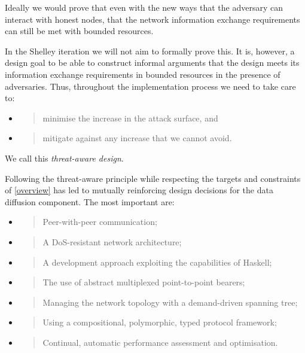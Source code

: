 \documentclass[11pt,a4paper]{article}
\begin{document}
Ideally we would prove that even with the new ways that the adversary
can interact with honest nodes, that the network information exchange
requirements can still be met with bounded resources.

In the Shelley iteration we will not aim to formally prove this. It is,
however, a design goal to be able to construct informal arguments that
the design meets its information exchange requirements in bounded
resources in the presence of adversaries. Thus, throughout the
implementation process we need to take care to:

\begin{itemize}
\item
  \begin{quote}
  minimise the increase in the attack surface, and
  \end{quote}
\item
  \begin{quote}
  mitigate against any increase that we cannot avoid.
  \end{quote}
\end{itemize}

We call this \emph{threat-aware design}.

Following the threat-aware principle while respecting the targets and
constraints of \cref{overview} has led to
mutually reinforcing design decisions for the data diffusion component.
The most important are:

\begin{itemize}
\item
  \begin{quote}
  Peer-with-peer communication;
  \end{quote}
\item
  \begin{quote}
  A DoS-resistant network architecture;
  \end{quote}
\item
  \begin{quote}
  A development approach exploiting the capabilities of Haskell;
  \end{quote}
\item
  \begin{quote}
  The use of abstract multiplexed point-to-point bearers;
  \end{quote}
\item
  \begin{quote}
  Managing the network topology with a demand-driven spanning tree;
  \end{quote}
\item
  \begin{quote}
  Using a compositional, polymorphic, typed protocol framework;
  \end{quote}
\item
  \begin{quote}
  Continual, automatic performance assessment and optimisation.
  \end{quote}
\end{itemize}
\end{document}
